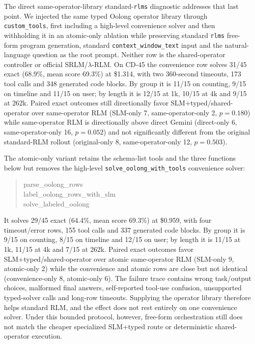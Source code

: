 \documentclass[letterpaper]{article}
\begin{document}
The direct same-operator-library standard-\texttt{rlms} diagnostic addresses that last point. We injected the same typed Oolong operator library through \texttt{custom\_tools}, first including a high-level convenience solver and then withholding it in an atomic-only ablation while preserving standard \texttt{rlms} free-form program generation, standard \texttt{context\_window\_text} input and the natural-language question as the root prompt. Neither row is the shared-operator controller or official SRLM/$\lambda$-RLM. On CD-45 the convenience row solves 31/45 exact (68.9\%, mean score 69.3\%) at \$1.314, with two 360-second timeouts, 173 tool calls and 348 generated code blocks. By group it is 11/15 on counting, 9/15 on timeline and 11/15 on user; by length it is 12/15 at 1k, 10/15 at 4k and 9/15 at 262k. Paired exact outcomes still directionally favor SLM+typed/shared-operator over same-operator RLM (SLM-only 7, same-operator-only 2, $p=0.180$) while same-operator RLM is directionally above direct Gemini (direct-only 6, same-operator-only 16, $p=0.052$) and not significantly different from the original standard-RLM rollout (original-only 8, same-operator-only 12, $p=0.503$).

The atomic-only variant retains the schema-list tools and the three functions below but removes the high-level \texttt{solve\_oolong\_with\_tools} convenience solver:
\begin{quote}
\small\ttfamily
parse\_oolong\_rows\\[-1pt]
label\_oolong\_rows\_with\_slm\\[-1pt]
solve\_labeled\_oolong
\end{quote}
It solves 29/45 exact (64.4\%, mean score 69.3\%) at \$0.959, with four timeout/error rows, 155 tool calls and 337 generated code blocks. By group it is 9/15 on counting, 8/15 on timeline and 12/15 on user; by length it is 11/15 at 1k, 11/15 at 4k and 7/15 at 262k. Paired exact outcomes favor SLM+typed/shared-operator over atomic same-operator RLM (SLM-only 9, atomic-only 2) while the convenience and atomic rows are close but not identical (convenience-only 8, atomic-only 6). The failure trace contains wrong task/output choices, malformed final answers, self-reported tool-use confusion, unsupported typed-solver calls and long-row timeouts. Supplying the operator library therefore helps standard RLM, and the effect does not rest entirely on one convenience solver. Under this bounded protocol, however, free-form orchestration still does not match the cheaper specialized SLM+typed route or deterministic shared-operator execution.
\end{document}
